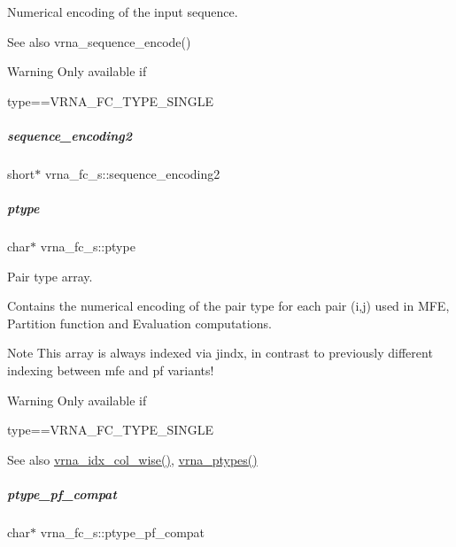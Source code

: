 Numerical encoding of the input sequence. 

\begin{DoxySeeAlso}{See also}
vrna\+\_\+sequence\+\_\+encode() 
\end{DoxySeeAlso}
\begin{DoxyWarning}{Warning}
Only available if\begin{DoxyVerb}type==VRNA_FC_TYPE_SINGLE \end{DoxyVerb}
 
\end{DoxyWarning}
\mbox{\label{group__fold__compound_aaf9064092f674882e78665e1646ffdbf}} 
\subparagraph{\texorpdfstring{sequence\+\_\+encoding2}{sequence\_encoding2}}
{\footnotesize\ttfamily short$\ast$ vrna\+\_\+fc\+\_\+s\+::sequence\+\_\+encoding2}

\mbox{\label{group__fold__compound_a3fbea559f1d1976b2d67c215cdeee0b2}} 
\subparagraph{\texorpdfstring{ptype}{ptype}}
{\footnotesize\ttfamily char$\ast$ vrna\+\_\+fc\+\_\+s\+::ptype}



Pair type array. 

Contains the numerical encoding of the pair type for each pair (i,j) used in M\+FE, Partition function and Evaluation computations. \begin{DoxyNote}{Note}
This array is always indexed via jindx, in contrast to previously different indexing between mfe and pf variants! 
\end{DoxyNote}
\begin{DoxyWarning}{Warning}
Only available if\begin{DoxyVerb}type==VRNA_FC_TYPE_SINGLE \end{DoxyVerb}
 
\end{DoxyWarning}
\begin{DoxySeeAlso}{See also}
\mbox{\hyperlink{group__utils_ga89ebc69c52fa0c78c9e1974b0017746b}{vrna\+\_\+idx\+\_\+col\+\_\+wise()}}, \mbox{\hyperlink{group__utils_ga51a9e86a5f731f5f2f5584ee67cee4a8}{vrna\+\_\+ptypes()}} 
\end{DoxySeeAlso}
\mbox{\label{group__fold__compound_a7fe1235ce3d41287695f1ae1e283e8fc}} 
\subparagraph{\texorpdfstring{ptype\+\_\+pf\+\_\+compat}{ptype\_pf\_compat}}
{\footnotesize\ttfamily char$\ast$ vrna\+\_\+fc\+\_\+s\+::ptype\+\_\+pf\+\_\+compat}



